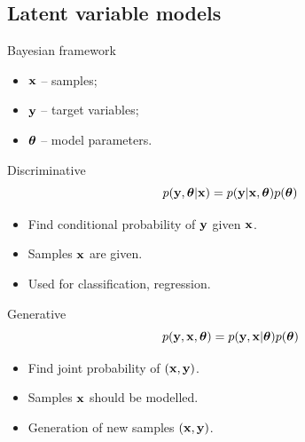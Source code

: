 \subsection{Latent variable models}
\begin{frame}{Bayesian framework}
\begin{itemize}
    \item $\mathbf{x}$ -- samples;
    \item $\mathbf{y}$ -- target variables;
    \item $\boldsymbol{\theta}$ -- model parameters.
\end{itemize}
\begin{minipage}[t]{0.5\columnwidth}
\begin{block}{Discriminative}
    \[
        p(\mathbf{y}, \boldsymbol{\theta} | \mathbf{x}) = p(\mathbf{y} | \mathbf{x}, \boldsymbol{\theta}) p(\boldsymbol{\theta})
    \]
    \begin{itemize}
        \item Find conditional probability of $\mathbf{y}$ given $\mathbf{x}$. \\
        \item Samples $\mathbf{x}$ are given. \\
        \item Used for classification, regression.
    \end{itemize}
\end{block}
\end{minipage}%
\begin{minipage}[t]{0.5\columnwidth}
\begin{block}{Generative}
    \[
        p(\mathbf{y}, \mathbf{x}, \boldsymbol{\theta}) = p(\mathbf{y}, \mathbf{x} | \boldsymbol{\theta}) p(\boldsymbol{\theta})
    \]
    \begin{itemize}
        \item Find joint probability of $(\mathbf{x}, \mathbf{y})$.
        \item Samples $\mathbf{x}$ should be modelled. \\
        \item Generation of new samples $(\mathbf{x}, \mathbf{y})$.
    \end{itemize}
\end{block}
\end{minipage}
\end{frame}
